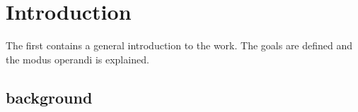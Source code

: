 \chapter{Introduction}
\label{cha:intro}
The first contains a general introduction to the work. The goals are
defined and the modus operandi is explained.

\section{background}

